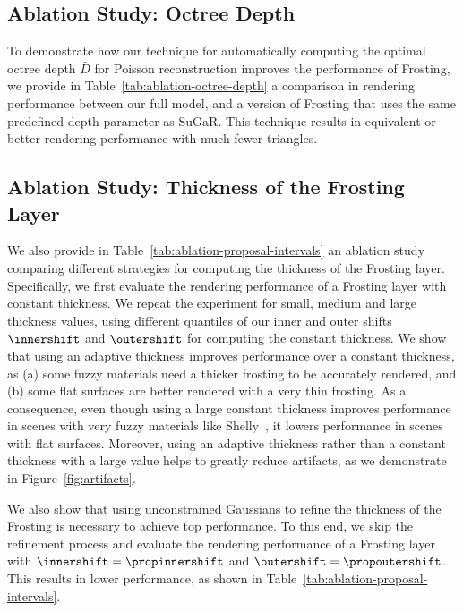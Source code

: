 \subsection{Ablation Study: Octree Depth}


To demonstrate how our technique for automatically computing the optimal octree depth $\bar{D}$ for Poisson reconstruction improves the performance of Frosting, we provide in Table~\ref{tab:ablation-octree-depth} a comparison in rendering performance between our full model, and a version of Frosting that uses the same predefined depth parameter as SuGaR. This technique results in equivalent or better rendering performance with much fewer triangles.


\subsection{Ablation Study: Thickness of the Frosting Layer}



We also provide in Table~\ref{tab:ablation-proposal-intervals} an ablation study comparing different strategies for computing the thickness of the Frosting layer. 
%
Specifically, we first evaluate the rendering performance of a Frosting layer with constant thickness. We repeat the experiment for small, medium and large thickness values, using different quantiles of our inner and outer shifts~$\innershift$ and $\outershift$ for computing the constant thickness.
%
We show that using an adaptive thickness improves performance over a constant thickness, as (a) some fuzzy materials need a thicker frosting to be accurately rendered, and (b) some flat surfaces are better rendered with a very thin frosting. 
%
As a consequence, even though using a large constant thickness improves performance in scenes with very fuzzy materials like Shelly~\cite{wang-siggraphasia2023-adaptive-shells}, it lowers performance in scenes with flat surfaces. Moreover, using an adaptive thickness rather than a constant thickness with a large value helps to greatly reduce artifacts, as we demonstrate in Figure~\ref{fig:artifacts}.

We also show that using unconstrained Gaussians to refine the thickness of the Frosting is necessary to achieve top performance. To this end, we skip the refinement process and evaluate the rendering performance of a Frosting layer with $\innershift=\propinnershift$ and $\outershift=\propoutershift$. This results in lower performance, as shown in Table~\ref{tab:ablation-proposal-intervals}.